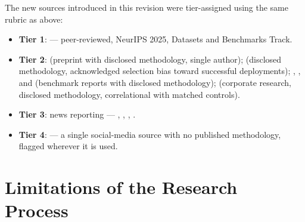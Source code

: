 The new sources introduced in this revision were tier-assigned using the same rubric as above:

\begin{itemize}
  \item \textbf{Tier 1}: \parencite{Cemri2025} --- peer-reviewed, NeurIPS 2025, Datasets and Benchmarks Track.
  \item \textbf{Tier 2}: \parencite{Liu2026} (preprint with disclosed methodology, single author); \parencite{Pereira2026Playbook} (disclosed methodology, acknowledged selection bias toward successful deployments); \parencite{RLI2025}, \parencite{CAIS2026RLI}, and \parencite{METR2026} (benchmark reports with disclosed methodology); \parencite{RampRevelio2026} (corporate research, disclosed methodology, correlational with matched controls).
  \item \textbf{Tier 3}: news reporting --- \parencite{Challenger2026}, \parencite{NYTChina2026}, \parencite{Bloomberg2026Ford}, \parencite{Chatterji2026}.
  \item \textbf{Tier 4}: \parencite{Levie2026} --- a single social-media source with no published methodology, flagged wherever it is used.
\end{itemize}

\section{Limitations of the Research Process}

